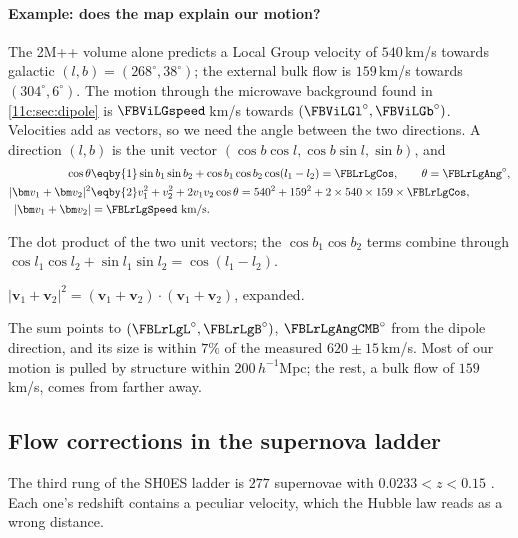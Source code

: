 \paragraph{Example: does the map explain our motion?} The 2M++ volume alone predicts a
Local Group velocity of $540$\,km/s towards galactic $(l,b)=(268^\circ,38^\circ)$; the
external bulk flow is $159$\,km/s towards $(304^\circ,6^\circ)$. The motion through
the microwave background found in \cref{11c:sec:dipole} is $\FBViLGspeed$\,km/s towards
$(\FBViLGl^\circ,\FBViLGb^\circ)$. Velocities add as vectors, so we need the angle between
the two directions. A direction $(l,b)$ is the unit vector
$(\cos b\cos l,\cos b\sin l,\sin b)$, and
\begin{align}
  \cos\theta
  &\eqby{1}\sin b_1\sin b_2+\cos b_1\cos b_2\cos(l_1-l_2)
   =\FBLrLgCos,\qquad\theta=\FBLrLgAng^\circ,
  \nonumber\\
  |\bm v_1+\bm v_2|^2
  &\eqby{2}v_1^2+v_2^2+2v_1v_2\cos\theta
   =540^2+159^2+2\times540\times159\times\FBLrLgCos,
  \nonumber\\
  |\bm v_1+\bm v_2|
  &=\FBLrLgSpeed\ \text{km/s}.
  \label{11c:eq:lg-sum}
\end{align}
\begin{explain}
  \item The dot product of the two unit vectors; the $\cos b_1\cos b_2$ terms combine
        through $\cos l_1\cos l_2+\sin l_1\sin l_2=\cos(l_1-l_2)$.
  \item $|\bm v_1+\bm v_2|^2=(\bm v_1+\bm v_2)\cdot(\bm v_1+\bm v_2)$, expanded.
\end{explain}
The sum points to $(\FBLrLgL^\circ,\FBLrLgB^\circ)$, $\FBLrLgAngCMB^\circ$ from the dipole
direction, and its size is within $7\%$ of the measured $620\pm15$\,km/s. Most of our
motion is pulled by structure within $200\,h^{-1}$Mpc; the rest, a bulk flow of
$159$\,km/s, comes from farther away.

\subsection{Flow corrections in the supernova ladder}
\label{11c:sec:research-shoes}

The third rung of the SH0ES ladder is $277$ supernovae with $0.0233<z<0.15$
\cite{Riess2022SH0ES}. Each one's redshift contains a peculiar velocity, which the
Hubble law reads as a wrong distance.

